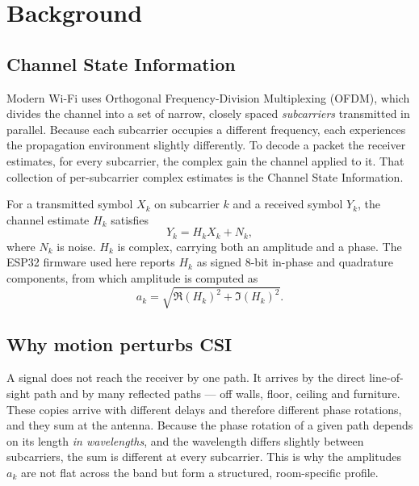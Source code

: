 \documentclass[11pt,a4paper]{article}
\begin{document}
\section{Background}

\subsection{Channel State Information}

Modern Wi-Fi uses Orthogonal Frequency-Division Multiplexing (OFDM), which
divides the channel into a set of narrow, closely spaced \emph{subcarriers}
transmitted in parallel. Because each subcarrier occupies a different
frequency, each experiences the propagation environment slightly differently.
To decode a packet the receiver estimates, for every subcarrier, the complex
gain the channel applied to it. That collection of per-subcarrier complex
estimates is the Channel State Information.

For a transmitted symbol $X_k$ on subcarrier $k$ and a received symbol $Y_k$,
the channel estimate $H_k$ satisfies
\begin{equation}
  Y_k = H_k X_k + N_k ,
\end{equation}
where $N_k$ is noise. $H_k$ is complex, carrying both an amplitude and a phase.
The ESP32 firmware used here reports $H_k$ as signed 8-bit in-phase and
quadrature components, from which amplitude is computed as
\begin{equation}
  a_k = \sqrt{\Re(H_k)^2 + \Im(H_k)^2}.
  \label{eq:amp}
\end{equation}

\subsection{Why motion perturbs CSI}

A signal does not reach the receiver by one path. It arrives by the direct
line-of-sight path and by many reflected paths --- off walls, floor, ceiling
and furniture. These copies arrive with different delays and therefore
different phase rotations, and they sum at the antenna. Because the phase
rotation of a given path depends on its length \emph{in wavelengths}, and the
wavelength differs slightly between subcarriers, the sum is different at every
subcarrier. This is why the amplitudes $a_k$ are not flat across the band but
form a structured, room-specific profile.
\end{document}
